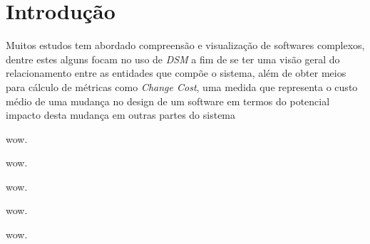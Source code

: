 \documentclass{abnt}
\begin{document}
\section{Introdução}

Muitos estudos tem abordado compreensão e visualização de softwares complexos,
dentre estes alguns focam no uso de {\it DSM} a fim de se ter uma visão geral
do relacionamento entre as entidades que compõe o sistema, além de obter meios
para cálculo de métricas como {\it Change Cost}, uma medida que representa o
custo médio de uma mudança no design de um software em termos do potencial
impacto desta mudança em outras partes do sistema

wow\cite{theRoleOfExperimentation}.

wow\cite{towardsAComputerizedInfrastructure}.

wow\cite{knowledgeSharingIssues}.

wow\cite{usingRepositoryOfRepositories}.

wow\cite{flossmoleACollaborativeRepository}.


\end{document}
